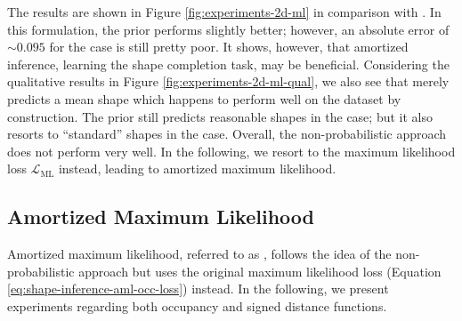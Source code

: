 The results are shown in Figure \ref{fig:experiments-2d-ml} in comparison
with \ML. In this formulation,
the \VAE prior performs slightly better; however, an absolute error \Abs
of $\sim 0.095$ for the \easy case is still pretty poor. It shows, however, that
amortized inference, \ie learning the shape completion task, may be beneficial.
Considering the qualitative results in Figure \ref{fig:experiments-2d-ml-qual},
we also see that \PPCA merely predicts a mean shape which happens to perform
well on the \Rect dataset by construction. The \VAE prior still predicts
reasonable shapes in the \easy case; but it also resorts to ``standard''
shapes in the \hard case. Overall, the non-probabilistic approach does not perform
very well. In the following, we resort to the maximum likelihood loss
$\mathcal{L}_{\text{ML}}$ instead, leading to amortized maximum likelihood.


\subsection{Amortized Maximum Likelihood}
\label{sec:experiments-2d-aml}

Amortized maximum likelihood, referred to as \AML, follows the idea of
the non-probabilistic approach but uses the original maximum likelihood
loss (\cf Equation \eqref{eq:shape-inference-aml-occ-loss})
instead. In the following, we present experiments regarding both occupancy
and signed distance functions.





